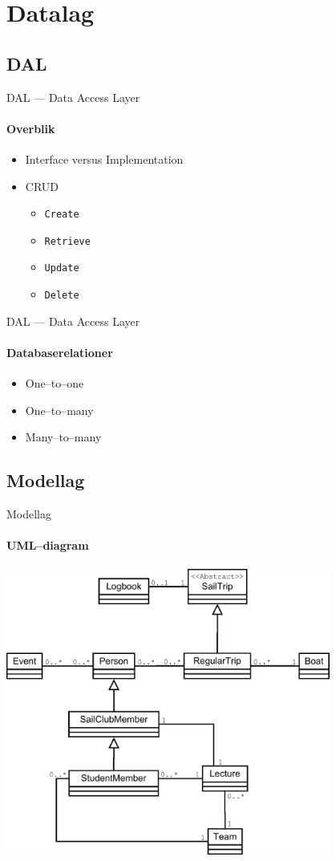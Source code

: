 \section{Datalag}

\subsection{DAL}

\begin{frame}{DAL --- Data Access Layer}
  \framesubtitle{Overblik}
  \begin{itemize}
    \item Interface versus Implementation
    \item CRUD
    \begin{itemize}
      \item \texttt{{\Large C}reate}
      \item \texttt{{\Large R}etrieve}
      \item \texttt{{\Large U}pdate}
      \item \texttt{{\Large D}elete}
    \end{itemize}
  \end{itemize}
\end{frame}

\begin{frame}{DAL --- Data Access Layer}
  \framesubtitle{Databaserelationer}
  \begin{itemize}
    \item One--to--one
    \item One--to--many
    \item Many--to--many
  \end{itemize}
\end{frame}


\subsection{Modellag}

\begin{frame}{Modellag}
  \framesubtitle{UML--diagram}
  \begin{center}
    \includegraphics[width=0.8\textwidth,height=0.8\textheight,keepaspectratio]{images/UML.pdf}
  \end{center}
\end{frame}


